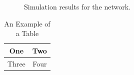 \documentclass[conference,compsoc]{IEEEtran}
\begin{document}
\begin{figure}[!t]
\centering
{}
\hfil
{}
\caption{Simulation results for the network.}
\label{fig_sim2}
\end{figure}

\begin{table}[!t]
\renewcommand{\arraystretch}{1.3}
\caption{An Example of a Table}
\label{table_example}
\centering
\begin{tabular}{|c||c|}
\hline
One & Two\\
\hline
Three & Four\\
\hline
\end{tabular}
\end{table}



\end{document}
